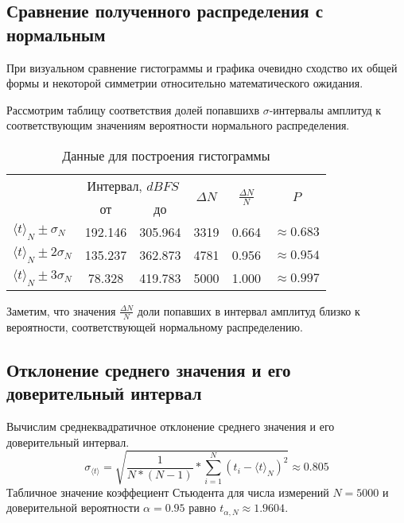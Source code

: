 \documentclass[12pt, a4paper]{article}
\begin{document}
\subsection{Сравнение полученного распределения с нормальным}
При визуальном сравнение гистограммы и графика очевидно сходство их общей формы и некоторой симметрии относительно математического ожидания.  

Рассмотрим таблицу соответствия долей попавшихв $\sigma$-интервалы амплитуд к соответствующим значениям вероятности нормального распределения.
\begin{table}[!h]
\begin{center}
\begin{tabular}{|l|c|c|c|c|c|}
\hline
\multirow{2}{*}{} & \multicolumn{2}{c}{Интервал, $dBFS$} & \multirow{2}{*}{$\Delta N$} & \multirow{2}{*}{$\frac{\Delta N}{N}$} & \multirow{2}{*}{$P$}\\
\cline{2-3}
& от & до & & &\\
\hline 

$\langle t \rangle_N \pm \sigma_N$  & 192.146 & 305.964 &  3319& 0.664&$\approx 0.683$ \\
\hline
$\langle t \rangle_N \pm 2\sigma_N$  & 135.237 & 362.873 & 4781& 0.956&$\approx 0.954$\\
\hline
$\langle t \rangle_N \pm 3\sigma_N$ & 78.328 & 419.783 & 5000& 1.000 & $\approx 0.997$\\
\hline
\end{tabular}
\caption{Данные для построения гистограммы}
\end{center}
\label{tab:3}
\end{table}

Заметим, что значения $\frac{\Delta N}{N}$ доли попавших в интервал амплитуд близко к вероятности, соответствующей нормальному распределению. 

\subsection{Отклонение среднего значения и его доверительный интервал}
Вычислим среднеквадратичное отклонение среднего значения и его доверительный интервал.
\begin{equation*}
\sigma_{\langle t \rangle} = \sqrt{ \frac{1}{N * (N-1)} * \sum^N_{i=1} (t_i - \langle t \rangle_N)^2} \approx 0.805
\end{equation*}
Табличное значение коэффециент Стьюдента для числа измерений $N=5000$ и доверительной вероятности $\alpha=0.95$ равно $t_{\alpha, N}\approx 1.9604$.
\end{document}
